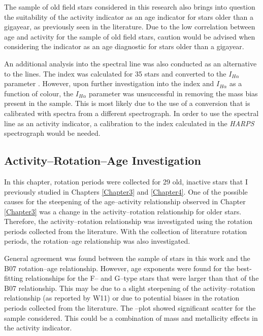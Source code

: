 The sample of old field stars considered in this research also brings into question the suitability of the \Rprime activity indicator as an age indicator for stars older than a gigayear, as previously seen in the literature. Due to the low correlation between age and activity for the sample of old field stars, caution would be advised when considering the \Rprime indicator as an age diagnostic for stars older than a gigayear.

An additional analysis into the \Halpha spectral line was also conducted as an alternative to the \caII lines. The \Halpha index was calculated for 35 stars and converted to the $I_{H\alpha}$ parameter \citep{Gomes_da_Silva_etal_2014}. However, upon further investigation into the \Halpha index and $I_{H\alpha}$ as a function of colour, the $I_{H\alpha}$ parameter was unsuccessful in removing the mass bias present in the sample. This is most likely due to the use of a conversion that is calibrated with spectra from a different spectrograph. In order to use the \Halpha spectral line as an activity indicator, a calibration to the \Halpha index calculated in the \textit{HARPS} spectrograph would be needed.

\subsection{Activity--Rotation--Age Investigation}

In this chapter, rotation periods were collected for 29 old, inactive stars that I previously studied in Chapters \ref{Chapter3} and \ref{Chapter4}. One of the possible causes for the steepening of the age--activity relationship observed in Chapter \ref{Chapter3} was a change in the activity--rotation relationship for older stars. Therefore, the activity--rotation relationship was investigated using the rotation periods collected from the literature. With the collection of literature rotation periods, the rotation--age relationship was also investigated. 

General agreement was found between the sample of stars in this work and the B07 rotation--age relationship. However, age exponents were found for the best-fitting relationships for the F-- and G--type stars that were larger than that of the B07 relationship. This may be due to a slight steepening of the activity--rotation relationship (as reported by W11) or due to potential biases in the rotation periods collected from the literature. The \Rprime--\Ro plot showed significant scatter for the sample considered. This could be a combination of mass and metallicity effects in the \Rprime activity indicator.

